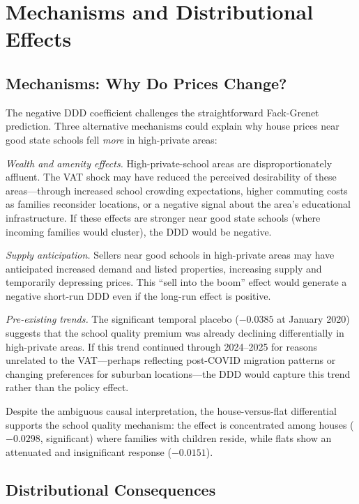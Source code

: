 \documentclass[12pt]{article}
\begin{document}
\section{Mechanisms and Distributional Effects}\label{sec:mechanisms}

\subsection{Mechanisms: Why Do Prices Change?}

The negative DDD coefficient challenges the straightforward Fack-Grenet prediction. Three alternative mechanisms could explain why house prices near good state schools fell \textit{more} in high-private areas:

\textit{Wealth and amenity effects.} High-private-school areas are disproportionately affluent. The VAT shock may have reduced the perceived desirability of these areas---through increased school crowding expectations, higher commuting costs as families reconsider locations, or a negative signal about the area's educational infrastructure. If these effects are stronger near good state schools (where incoming families would cluster), the DDD would be negative.

\textit{Supply anticipation.} Sellers near good schools in high-private areas may have anticipated increased demand and listed properties, increasing supply and temporarily depressing prices. This ``sell into the boom'' effect would generate a negative short-run DDD even if the long-run effect is positive.

\textit{Pre-existing trends.} The significant temporal placebo ($-0.0385$ at January 2020) suggests that the school quality premium was already declining differentially in high-private areas. If this trend continued through 2024--2025 for reasons unrelated to the VAT---perhaps reflecting post-COVID migration patterns or changing preferences for suburban locations---the DDD would capture this trend rather than the policy effect.

Despite the ambiguous causal interpretation, the house-versus-flat differential supports the school quality mechanism: the effect is concentrated among houses ($-0.0298$, significant) where families with children reside, while flats show an attenuated and insignificant response ($-0.0151$).

\subsection{Distributional Consequences}
\end{document}
